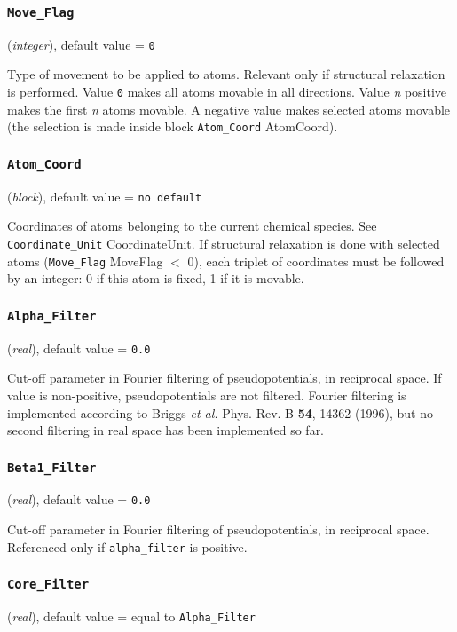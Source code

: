 \documentclass{article}
\begin{document}
\subsubsection{\tt Move\_Flag 
\label{MoveFlag}}
({\it integer}),
default value = {\tt 0 }

Type of movement to be applied to atoms. Relevant only if structural relaxation
is performed. Value {\tt 0} makes all atoms movable in all directions. Value
{\it n}
positive makes the first {\it n} atoms movable. A negative value makes selected atoms
movable (the selection is made inside block {\tt Atom\_Coord}
{AtomCoord}).

\subsubsection{\tt Atom\_Coord 
\label{AtomCoord}}
({\it block}),
default value = {\tt no default }

Coordinates of atoms belonging to the current chemical species. See
{\tt Coordinate\_Unit} {CoordinateUnit}. If structural relaxation is done with selected atoms
({\tt Move\_Flag} {MoveFlag} $<$ 0), each triplet of coordinates
must be followed by an integer: 0 if this atom is fixed, 1 if it is movable.

\subsubsection{\tt Alpha\_Filter 
\label{AlphaFilter}}
({\it real}),
default value = {\tt 0.0 }

Cut-off parameter in Fourier filtering of pseudopotentials, in reciprocal
space. If value is non-positive, pseudopotentials are not
filtered. Fourier filtering is implemented according to Briggs {\it et
  al.} Phys. Rev. B {\bf 54}, 14362 (1996), but no second filtering in
real space has been implemented so far.

\subsubsection{\tt Beta1\_Filter 
\label{Beta1Filter}}
({\it real}),
default value = {\tt 0.0 }

Cut-off parameter in Fourier filtering of pseudopotentials, in reciprocal
space. Referenced only if {\tt alpha\_filter} is positive.

\subsubsection{\tt Core\_Filter 
\label{CoreFilter}}
({\it  real}),
default value = equal to {\tt Alpha\_Filter}
\end{document}
